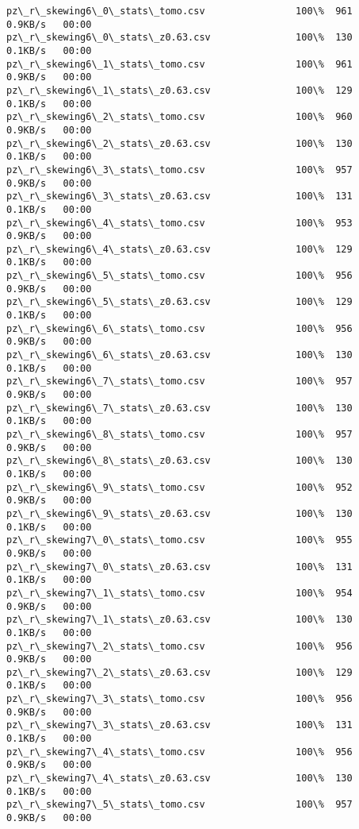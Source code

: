 \documentclass[11pt]{article}
\begin{document}
\begin{Verbatim}[commandchars=\\\{\}]
pz\_r\_skewing6\_0\_stats\_tomo.csv                100\%  961     0.9KB/s   00:00    
pz\_r\_skewing6\_0\_stats\_z0.63.csv               100\%  130     0.1KB/s   00:00    
pz\_r\_skewing6\_1\_stats\_tomo.csv                100\%  961     0.9KB/s   00:00    
pz\_r\_skewing6\_1\_stats\_z0.63.csv               100\%  129     0.1KB/s   00:00    
pz\_r\_skewing6\_2\_stats\_tomo.csv                100\%  960     0.9KB/s   00:00    
pz\_r\_skewing6\_2\_stats\_z0.63.csv               100\%  130     0.1KB/s   00:00    
pz\_r\_skewing6\_3\_stats\_tomo.csv                100\%  957     0.9KB/s   00:00    
pz\_r\_skewing6\_3\_stats\_z0.63.csv               100\%  131     0.1KB/s   00:00    
pz\_r\_skewing6\_4\_stats\_tomo.csv                100\%  953     0.9KB/s   00:00    
pz\_r\_skewing6\_4\_stats\_z0.63.csv               100\%  129     0.1KB/s   00:00    
pz\_r\_skewing6\_5\_stats\_tomo.csv                100\%  956     0.9KB/s   00:00    
pz\_r\_skewing6\_5\_stats\_z0.63.csv               100\%  129     0.1KB/s   00:00    
pz\_r\_skewing6\_6\_stats\_tomo.csv                100\%  956     0.9KB/s   00:00    
pz\_r\_skewing6\_6\_stats\_z0.63.csv               100\%  130     0.1KB/s   00:00    
pz\_r\_skewing6\_7\_stats\_tomo.csv                100\%  957     0.9KB/s   00:00    
pz\_r\_skewing6\_7\_stats\_z0.63.csv               100\%  130     0.1KB/s   00:00    
pz\_r\_skewing6\_8\_stats\_tomo.csv                100\%  957     0.9KB/s   00:00    
pz\_r\_skewing6\_8\_stats\_z0.63.csv               100\%  130     0.1KB/s   00:00    
pz\_r\_skewing6\_9\_stats\_tomo.csv                100\%  952     0.9KB/s   00:00    
pz\_r\_skewing6\_9\_stats\_z0.63.csv               100\%  130     0.1KB/s   00:00    
pz\_r\_skewing7\_0\_stats\_tomo.csv                100\%  955     0.9KB/s   00:00    
pz\_r\_skewing7\_0\_stats\_z0.63.csv               100\%  131     0.1KB/s   00:00    
pz\_r\_skewing7\_1\_stats\_tomo.csv                100\%  954     0.9KB/s   00:00    
pz\_r\_skewing7\_1\_stats\_z0.63.csv               100\%  130     0.1KB/s   00:00    
pz\_r\_skewing7\_2\_stats\_tomo.csv                100\%  956     0.9KB/s   00:00    
pz\_r\_skewing7\_2\_stats\_z0.63.csv               100\%  129     0.1KB/s   00:00    
pz\_r\_skewing7\_3\_stats\_tomo.csv                100\%  956     0.9KB/s   00:00    
pz\_r\_skewing7\_3\_stats\_z0.63.csv               100\%  131     0.1KB/s   00:00    
pz\_r\_skewing7\_4\_stats\_tomo.csv                100\%  956     0.9KB/s   00:00    
pz\_r\_skewing7\_4\_stats\_z0.63.csv               100\%  130     0.1KB/s   00:00    
pz\_r\_skewing7\_5\_stats\_tomo.csv                100\%  957     0.9KB/s   00:00    

\end{Verbatim}
\end{document}
